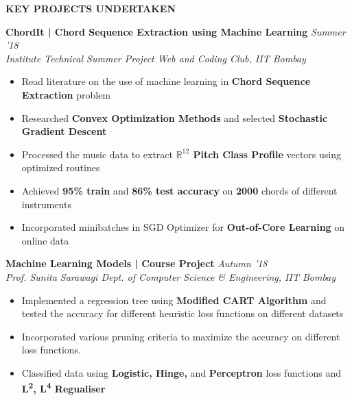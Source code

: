 \documentclass[11pt]{article}%
\begin{document}
\justifying
\noindent
\vspace*{3.5cm}

\begin{flushleft}
\vspace{0mm}
\bf{\LARGE{K}\Large{EY} \LARGE{P}\Large{ROJECTS} \LARGE{U}\Large{NDERTAKEN}}
\hrulefill
\end{flushleft}
\vspace{-7mm}
{\flushleft \bf \large{ChordIt | Chord Sequence Extraction using Machine Learning}} \hfill {{{\em {Summer '18}}}}\\
{\em{Institute Technical Summer Project {\textbar} Web and Coding Club, IIT Bombay}}
\begin{itemize}
\vspace{-0.2cm}
\setlength\itemsep{0.01em}
\item Read literature on the use of machine learning in {\bf Chord Sequence Extraction} problem
\vspace{-1.2mm}
\item Researched {\bf Convex Optimization Methods} and selected {\bf Stochastic Gradient Descent}
\vspace{-1.2mm}
\item  Processed the music data to extract {\bf $\mathbb{R}^{12}$ Pitch Class Profile} vectors using optimized routines
\vspace{-1.2mm}
\item Achieved {\bf 95\% train} and {\bf 86\% test accuracy} on {\bf 2000} chords of different instruments
\vspace{-1.2mm}
\item  Incorporated minibatches in SGD Optimizer for {\bf Out-of-Core Learning} on online data
\vspace{-1.2mm}
\end{itemize}
\vspace{-4mm}

{\flushleft \bf \large{Machine Learning Models | Course Project}} \hfill {{{\em{Autumn '18}}}} \\
{\em{Prof. Sunita Sarawagi {\textbar} Dept. of Computer Science \& Engineering, IIT Bombay}}
\vspace{-1mm}
\begin{itemize}
\setlength\itemsep{0.01em}
\vspace{-1mm}
\item Implemented a regression tree using {\bf Modified CART Algorithm} and tested the accuracy for
different heuristic loss functions on different datasets
\vspace{-1mm}
\item Incorporated various pruning criteria to maximize the accuracy on different loss functions.
\vspace{-1mm}
\item Classified data using {\bf Logistic, Hinge,} and {\bf Perceptron} loss functions and {\bf L\textsuperscript{2}, L\textsuperscript{4} Regualiser}
\end{itemize}
\vspace{-0.5cm}
\end{document}
